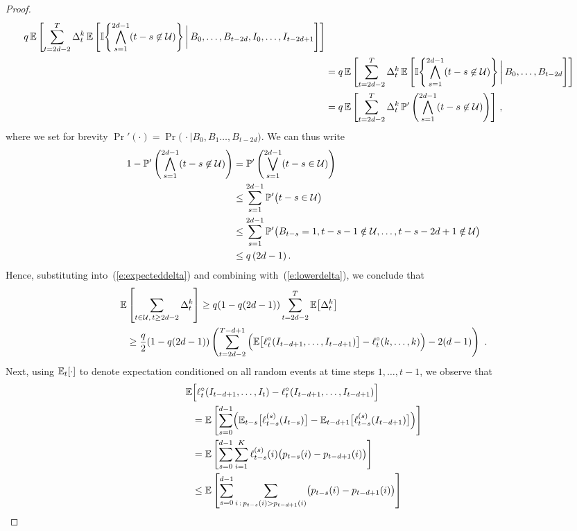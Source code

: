 \begin{proof}
\begin{align}
    q\,\mathbb{E}\left[\sum_{t=2d-2}^T \Delta_t^k\,\mathbb{E}\left[\mathbb{I}{\left\{\bigwedge_{s=1}^{2d-1}(t-s \not\in \mathcal{U})\right\}} \,\bigg|\, B_0,\dots,B_{t-2d},I_0,\ldots,I_{t-2d+1}  \right]
    \right]
\nonumber\\ &=
    q\,\mathbb{E}\left[\sum_{t=2d-2}^T \Delta_t^k\,\mathbb{E}\left[\mathbb{I}{\left\{\bigwedge_{s=1}^{2d-1}(t-s \not\in \mathcal{U})\right\}} \,\bigg|\, B_0,\dots,B_{t-2d} \right]
     \right]
\nonumber\\ &=
    q\,\mathbb{E}\left[\sum_{t=2d-2}^T \Delta_t^k\,\mathbb{P}'\left(\bigwedge_{s=1}^{2d-1}(t-s \not\in \mathcal{U}) \right)
     \right]\,,\label{e:expecteddelta}
\end{align}
where we set for brevity $\Pr'(\cdot) = \Pr\bigl(\,\cdot \mid
B_0,B_1\dots,B_{t-2d}\bigr)$.
%
We can thus write
%
\begin{align*}
    1 - \mathbb{P}'\left(\bigwedge_{s=1}^{2d-1}(t-s \not\in \mathcal{U}) \right)
&=
    \mathbb{P}'\left(\bigvee_{s=1}^{2d-1}(t-s \in \mathcal{U}) \right)
\\ &\le
    \sum_{s=1}^{2d-1}\mathbb{P}'\bigl(t-s \in \mathcal{U}\bigr)
\\ & \le
    \sum_{s=1}^{2d-1}\mathbb{P}'\bigl(B_{t-s} = 1, t-s-1 \notin \mathcal{U}, \ldots, t-s-2d+1 \notin \mathcal{U}\bigr)
\\ & \le
    q\,(2d-1)\,.
\end{align*}
%
Hence, substituting into~(\ref{e:expecteddelta}) and combining with~(\ref{e:lowerdelta}), we conclude that
%
\begin{align}
    \mathbb{E}&\left[\sum_{t \in \mathcal{U},\,t\geq 2d-2} \Delta_t^k \right]
\ge
    q(1-q(2d-1))\sum_{t=2d-2}^T \mathbb{E}\big[\Delta_t^k\big]
\nonumber
\\&\ge
    \frac{q}{2}(1-q(2d-1))\left( \sum_{t=2d-2}^{T-d+1} \Big(\mathbb{E}\big[\ell^{\circ}_t(I_{t-d+1},\dots,I_{t-d+1})\big] - \ell^{\circ}_t(k,\dots,k)\Big) - 2(d-1) \right)~.
     \label{e:updatenoupdate}
\end{align}
%
Next, using $\mathbb{E}_t[\cdot]$ to denote expectation conditioned on all random events at time steps $1,\dots,t-1$, we observe that
%
\begin{align}
\nonumber
    \E&\Bigl[ \lcomp_t(I_{t-d+1},\dots,I_t) - \lcomp_t(I_{t-d+1},\dots,I_{t-d+1}) \Bigr]
\\&=
\nonumber
    \E\left[ \sum_{s=0}^{d-1} \Bigl( \E_{t-s}\big[\loss_{t-s}^{(s)}(I_{t-s})\big] - \E_{t-d+1}\big[\loss_{t-s}^{(s)}(I_{t-d+1})\big] \Bigr)\right]
\\&=
\nonumber
    \E\left[ \sum_{s=0}^{d-1} \sum_{i=1}^K \loss_{t-s}^{(s)}(i) \bigl(p_{t-s}(i) - p_{t-d+1}(i)\bigr) \right]
\\&\le
\label{eq:stability}
    \E\left[ \sum_{s=0}^{d-1} \sum_{i\,:\,p_{t-s}(i) > p_{t-d+1}(i)} \bigl(p_{t-s}(i) - p_{t-d+1}(i)\bigr) \right]

\end{align}
\end{proof}
